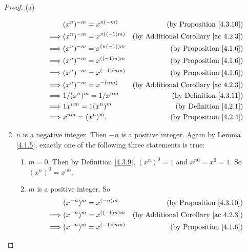 \begin{proof}{(a)}
\begin{enumerate}[label=(\Roman*)]
\begin{enumerate}[label=(\roman*)]
\begin{align*}
                                     & (x^n)^{-m} = x^{n(-m)}    & \text{(by Proposition \ref{4.3.10})}            \\
                            \implies & (x^n)^{-m} = x^{n((-1)m)} & \text{(by Additional Corollary \ref{ac 4.2.3})} \\
                            \implies & (x^n)^{-m} = x^{(n(-1))m} & \text{(by Proposition \ref{4.1.6})}             \\
                            \implies & (x^n)^{-m} = x^{((-1)n)m} & \text{(by Proposition \ref{4.1.6})}             \\
                            \implies & (x^n)^{-m} = x^{(-1)(nm)} & \text{(by Proposition \ref{4.1.6})}             \\
                            \implies & (x^n)^{-m} = x^{-(nm)}    & \text{(by Additional Corollary \ref{ac 4.2.3})} \\
                            \implies & 1 / (x^n)^m = 1 / x^{nm}  & \text{(by Definition \ref{4.3.11})}             \\
                            \implies & 1x^{nm} = 1(x^n)^m        & \text{(by Definition \ref{4.2.1})}              \\
                            \implies & x^{nm} = (x^n)^m.         & \text{(by Proposition \ref{4.2.4})}
                        \end{align*}
              \end{enumerate}
        \item \(n\) is a negative integer.
              Then \(-n\) is a positive integer.
              Again by Lemma \ref{4.1.5}, exactly one of the following three statements is true:
              \begin{enumerate}[label=(\roman*)]
                  \item \(m = 0\).
                        Then by Definition \ref{4.3.9}, \((x^n)^0 = 1\) and \(x^{n0} = x^0 = 1\).
                        So \((x^n)^0 = x^{n0}\).
                  \item \(m\) is a positive integer.
                        So
                        \begin{align*}
                                     & (x^{-n})^m = x^{(-n)m}    & \text{(by Proposition \ref{4.3.10})}            \\
                            \implies & (x^{-n})^m = x^{((-1)n)m} & \text{(by Additional Corollary \ref{ac 4.2.3})} \\
                            \implies & (x^{-n})^m = x^{(-1)(nm)} & \text{(by Proposition \ref{4.1.6})}             \\

\end{align*}
\end{enumerate}
\end{enumerate}
\end{proof}
